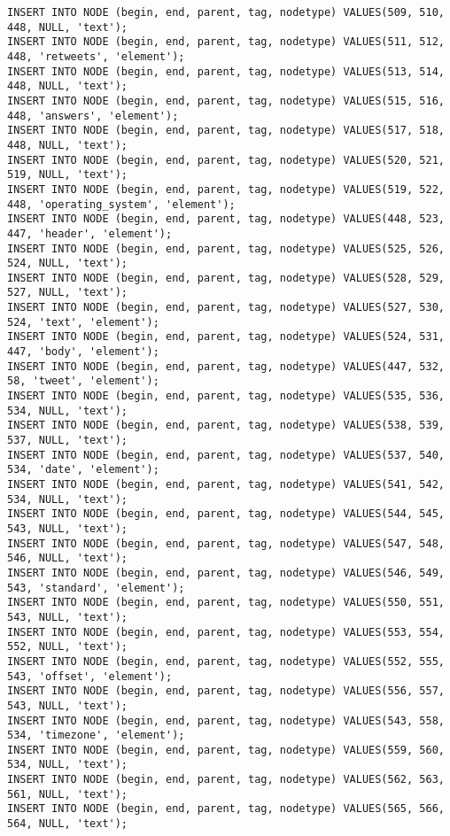 \begin{verbatim}
INSERT INTO NODE (begin, end, parent, tag, nodetype) VALUES(509, 510, 448, NULL, 'text');
INSERT INTO NODE (begin, end, parent, tag, nodetype) VALUES(511, 512, 448, 'retweets', 'element');
INSERT INTO NODE (begin, end, parent, tag, nodetype) VALUES(513, 514, 448, NULL, 'text');
INSERT INTO NODE (begin, end, parent, tag, nodetype) VALUES(515, 516, 448, 'answers', 'element');
INSERT INTO NODE (begin, end, parent, tag, nodetype) VALUES(517, 518, 448, NULL, 'text');
INSERT INTO NODE (begin, end, parent, tag, nodetype) VALUES(520, 521, 519, NULL, 'text');
INSERT INTO NODE (begin, end, parent, tag, nodetype) VALUES(519, 522, 448, 'operating_system', 'element');
INSERT INTO NODE (begin, end, parent, tag, nodetype) VALUES(448, 523, 447, 'header', 'element');
INSERT INTO NODE (begin, end, parent, tag, nodetype) VALUES(525, 526, 524, NULL, 'text');
INSERT INTO NODE (begin, end, parent, tag, nodetype) VALUES(528, 529, 527, NULL, 'text');
INSERT INTO NODE (begin, end, parent, tag, nodetype) VALUES(527, 530, 524, 'text', 'element');
INSERT INTO NODE (begin, end, parent, tag, nodetype) VALUES(524, 531, 447, 'body', 'element');
INSERT INTO NODE (begin, end, parent, tag, nodetype) VALUES(447, 532, 58, 'tweet', 'element');
INSERT INTO NODE (begin, end, parent, tag, nodetype) VALUES(535, 536, 534, NULL, 'text');
INSERT INTO NODE (begin, end, parent, tag, nodetype) VALUES(538, 539, 537, NULL, 'text');
INSERT INTO NODE (begin, end, parent, tag, nodetype) VALUES(537, 540, 534, 'date', 'element');
INSERT INTO NODE (begin, end, parent, tag, nodetype) VALUES(541, 542, 534, NULL, 'text');
INSERT INTO NODE (begin, end, parent, tag, nodetype) VALUES(544, 545, 543, NULL, 'text');
INSERT INTO NODE (begin, end, parent, tag, nodetype) VALUES(547, 548, 546, NULL, 'text');
INSERT INTO NODE (begin, end, parent, tag, nodetype) VALUES(546, 549, 543, 'standard', 'element');
INSERT INTO NODE (begin, end, parent, tag, nodetype) VALUES(550, 551, 543, NULL, 'text');
INSERT INTO NODE (begin, end, parent, tag, nodetype) VALUES(553, 554, 552, NULL, 'text');
INSERT INTO NODE (begin, end, parent, tag, nodetype) VALUES(552, 555, 543, 'offset', 'element');
INSERT INTO NODE (begin, end, parent, tag, nodetype) VALUES(556, 557, 543, NULL, 'text');
INSERT INTO NODE (begin, end, parent, tag, nodetype) VALUES(543, 558, 534, 'timezone', 'element');
INSERT INTO NODE (begin, end, parent, tag, nodetype) VALUES(559, 560, 534, NULL, 'text');
INSERT INTO NODE (begin, end, parent, tag, nodetype) VALUES(562, 563, 561, NULL, 'text');
INSERT INTO NODE (begin, end, parent, tag, nodetype) VALUES(565, 566, 564, NULL, 'text');

\end{verbatim}
